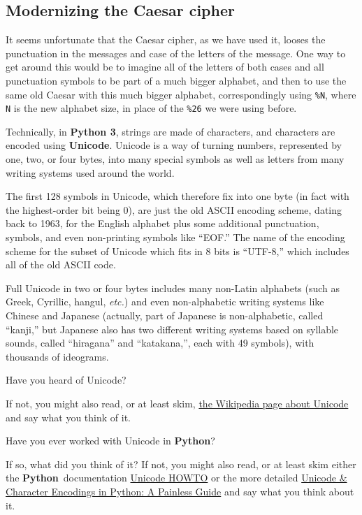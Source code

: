 \documentclass[12pt,letterpaper]{amsbook}
\theoremstyle{definition}
\theoremstyle{remark}
\numberwithin{figure}{section}
\numberwithin{exercise}{chapter}
\numberwithin{section}{chapter}
\numberwithin{equation}{section}
\numberwithin{table}{subsection}
\newcommand{\code}[1]{\colorbox{lg}{\texttt{#1}}}
\newcommand{\Python}{{\textbf{\ix{Python}}}}
\newcommand{\Pythonthree}{{\textbf{Python 3}}}
\newcommand{\blue}[1]{{\color{blue}#1}}
\newcommand{\bhref}[2]{{\href{#1}{\blue{#2}}}}
\newcommand{\ix}[1]{{#1}\index{#1}}
\begin{document}
\vskip1cm
\subsection{Modernizing the Caesar cipher}\label{ssec:TCcaiv_mtCc}
It seems unfortunate that the Caesar cipher, as we have used it, looses the
punctuation in the messages and case of the letters of the message.  One way
to get around this would be to imagine all of the letters of both cases and
all punctuation symbols to be part of a much bigger alphabet, and then to use
the same old Caesar with this much bigger alphabet, correspondingly using
\code{\%N}, where \code{N} is the new alphabet size, in place of the
\code{\%26} we were using before.

Technically, in \Pythonthree, strings are made of characters, and characters
are encoded using \textbf{Unicode}.  Unicode is a way of turning numbers,
represented by one, two, or four bytes, into many special symbols as well as
letters from many writing systems used around the world.

The first 128 symbols in Unicode, which therefore fix into one byte (in fact
with the highest-order bit being 0), are just the old ASCII encoding scheme,
dating back to 1963, for the English alphabet plus some additional punctuation,
symbols, and even non-printing symbols like ``EOF.''  The name of the encoding
scheme for the subset of Unicode which fits in 8 bits is ``UTF-8,'' which
includes all of the old ASCII code.

Full Unicode in two or four bytes includes many non-Latin alphabets (such as
Greek, Cyrillic, hangul, \textit{etc.}) and even non-alphabetic writing
systems like Chinese and Japanese (actually, part of Japanese is
non-alphabetic, called ``kanji,'' but Japanese also has two different writing
systems based on syllable sounds, called ``hiragana'' and ``katakana,'', each
with 49 symbols), with thousands of ideograms.

\vskip2mm
\begin{AZtcb}[label=az:unicode]{}{}
  Have you heard of Unicode?

  If not, you might also read, or at least skim,
  \bhref{https://en.wikipedia.org/wiki/Unicode}{the Wikipedia page about
    Unicode} and say what you think of it.

  Have you ever worked with Unicode in \Python?

  If so, what did you think of it?  If not, you might also read, or at least
  skim either the \Python\ documentation
  \bhref{https://docs.python.org/3/howto/unicode.html}{Unicode HOWTO} or
  the more detailed
  \bhref{https://realpython.com/python-encodings-guide/}{Unicode \& Character Encodings in Python: A Painless Guide} and say what you think about it.
\end{AZtcb}
\end{document}
